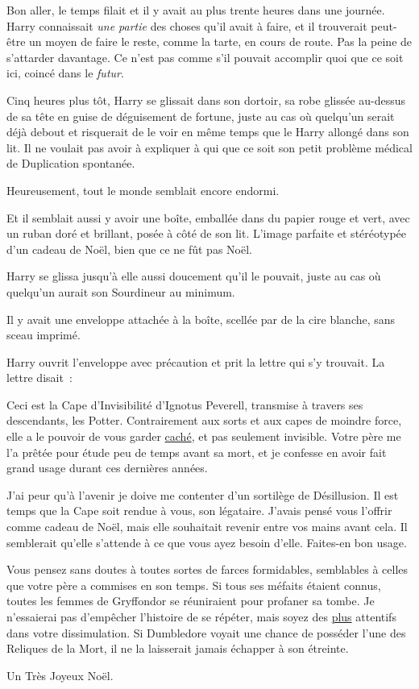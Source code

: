 Bon aller, le temps filait et il y avait au plus trente heures dans une journée. Harry connaissait \emph{une partie} des choses qu'il avait à faire, et il trouverait peut-être un moyen de faire le reste, comme la tarte, en cours de route. Pas la peine de s'attarder davantage. Ce n'est pas comme s'il pouvait accomplir quoi que ce soit ici, coincé dans le \emph{futur}.

\later


Cinq heures plus tôt, Harry se glissait dans son dortoir, sa robe glissée au-dessus de sa tête en guise de déguisement de fortune, juste au cas où quelqu'un serait déjà debout et risquerait de le voir en même temps que le Harry allongé dans son lit. Il ne voulait pas avoir à expliquer à qui que ce soit son petit problème médical de Duplication spontanée.

Heureusement, tout le monde semblait encore endormi.

Et il semblait aussi y avoir une boîte, emballée dans du papier rouge et vert, avec un ruban doré et brillant, posée à côté de son lit. L'image parfaite et stéréotypée d'un cadeau de Noël, bien que ce ne fût pas Noël.

Harry se glissa jusqu'à elle aussi doucement qu'il le pouvait, juste au cas où quelqu'un aurait son Sourdineur au minimum.

Il y avait une enveloppe attachée à la boîte, scellée par de la cire blanche, sans sceau imprimé.

Harry ouvrit l'enveloppe avec précaution et prit la lettre qui s'y trouvait. La lettre disait~:
\begin{writtenNote}

Ceci est la Cape d'Invisibilité d'Ignotus Peverell, transmise à travers ses descendants, les Potter. Contrairement aux sorts et aux capes de moindre force, elle a le pouvoir de vous garder \underline{caché}, et pas seulement invisible. Votre père me l'a prêtée pour étude peu de temps avant sa mort, et je confesse en avoir fait grand usage durant ces dernières années.

J'ai peur qu'à l'avenir je doive me contenter d'un sortilège de Désillusion. Il est temps que la Cape soit rendue à vous, son légataire. J'avais pensé vous l'offrir comme cadeau de Noël, mais elle souhaitait revenir entre vos mains avant cela. Il semblerait qu'elle s'attende à ce que vous ayez besoin d'elle. Faites-en bon usage.

Vous pensez sans doutes à toutes sortes de farces formidables, semblables à celles que votre père a commises en son temps. Si tous ses méfaits étaient connus, toutes les femmes de Gryffondor se réuniraient pour profaner sa tombe. Je n'essaierai pas d'empêcher l'histoire de se répéter, mais soyez des \underline{plus} attentifs dans votre dissimulation. Si Dumbledore voyait une chance de posséder l'une des Reliques de la Mort, il ne la laisserait jamais échapper à son étreinte.

Un Très Joyeux Noël.

\end{writtenNote}

